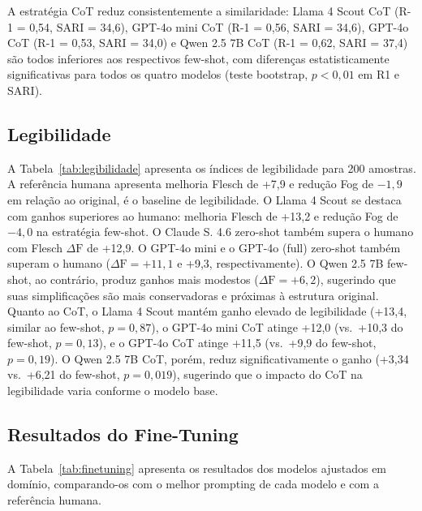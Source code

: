\documentclass[a4paper, twocolumn, 11pt, twoside]{article}
\begin{document}
A estratégia CoT reduz consistentemente a similaridade: Llama 4 Scout
CoT (R-1 = 0,54, SARI = 34,6), GPT-4o mini CoT (R-1 = 0,56,
SARI = 34,6), GPT-4o CoT (R-1 = 0,53, SARI = 34,0) e Qwen 2.5 7B CoT
(R-1 = 0,62, SARI = 37,4) são todos
inferiores aos respectivos few-shot, com diferenças estatisticamente
significativas para todos os quatro modelos
(teste bootstrap, $p < 0,01$ em R1 e SARI).

\subsection{Legibilidade}

A Tabela~\ref{tab:legibilidade} apresenta os índices de legibilidade
para 200 amostras. A referência humana apresenta melhoria Flesch de
+7,9 e redução Fog de $-1,9$ em relação ao original, é o
baseline de legibilidade. O Llama 4 Scout se destaca com ganhos
superiores ao humano: melhoria Flesch de +13,2 e redução Fog de $-4,0$
na estratégia few-shot. O Claude S. 4.6 zero-shot também supera o
humano com Flesch $\Delta \mathrm{F}$ de +12,9. O GPT-4o mini e o GPT-4o (full)
zero-shot também superam o humano ($\Delta \mathrm{F} = +11,1$ e +9,3,
respectivamente). O Qwen 2.5 7B few-shot, ao contrário, produz ganhos
mais modestos ($\Delta \mathrm{F} = +6,2$), sugerindo que suas simplificações
são mais conservadoras e próximas à estrutura original.
Quanto ao CoT, o Llama 4 Scout mantém ganho elevado de
legibilidade (+13,4, similar ao few-shot, $p=0,87$), o
GPT-4o mini CoT atinge +12,0 (vs.\ +10,3 do few-shot, $p=0,13$),
e o GPT-4o CoT atinge +11,5 (vs.\ +9,9 do few-shot, $p=0,19$).
O Qwen 2.5 7B CoT, porém, reduz significativamente o ganho
(+3,34 vs.\ +6,21 do few-shot, $p=0,019$),
sugerindo que o impacto do CoT na legibilidade varia conforme o
modelo base.

\subsection{Resultados do Fine-Tuning}

A Tabela~\ref{tab:finetuning} apresenta os resultados dos modelos
ajustados em domínio, comparando-os com o melhor prompting de cada modelo e com
a referência humana.
\end{document}
